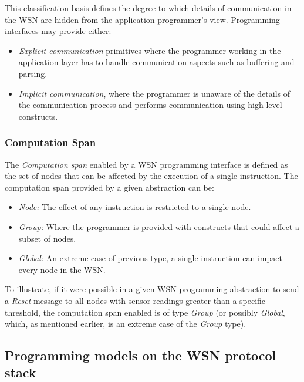 This classification basis defines the degree to which details of communication
in the WSN are hidden from the application programmer's view. Programming
interfaces may provide either:

\begin{itemize}
  \item \emph{Explicit communication} primitives where the
  programmer working in the application layer has to handle communication
  aspects such as buffering and parsing.
  \item \emph{Implicit communication}, where the programmer is unaware of the
  details of the communication process and performs communication using
  high-level constructs.
\end{itemize}

\subsubsection{Computation Span}

The \emph{Computation span} enabled by a WSN programming interface is defined
as the set of nodes that can be affected by the execution of a single
instruction. The
computation span provided by a given abstraction can be:

\begin{itemize}
  \item \emph{Node:} The effect of any instruction is restricted to a single
  node.
  \item \emph{Group:} Where the programmer is provided with constructs that
  could affect a subset of nodes.  
  \item \emph{Global:} An extreme case of previous type, a single instruction
  can impact every node in the WSN.
\end{itemize}

To illustrate, if it were possible in a given WSN programming abstraction to
send a \emph{Reset} message to all nodes with sensor readings greater than a
specific threshold, the computation span enabled is of type \emph{Group} (or
possibly \emph{Global}, which, as mentioned earlier, is an extreme case of the
\emph{Group} type).

\subsection{Programming models on the WSN protocol stack}

